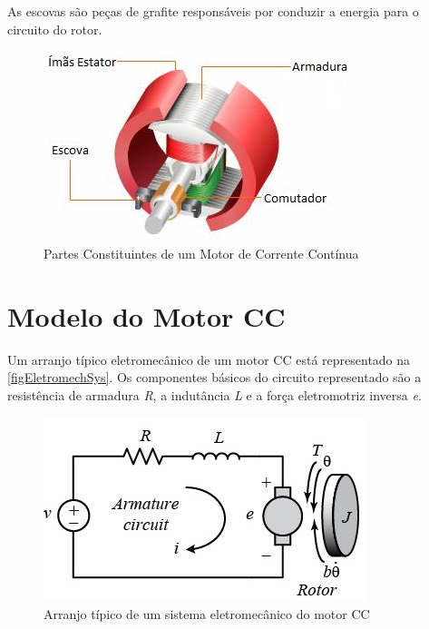 \documentclass[
	12pt,				%
	openright,			%
	oneside,			%
	a4paper,			%
	english,			%
	french,				%
	spanish,			%
	brazil,				%
	]{abntex2}
\begin{document}
As escovas são peças de grafite responsáveis por conduzir a energia para o circuito do rotor.

\begin{figure}[htb]
	\caption{\label{figMotorDC}Partes Constituintes de um Motor de Corrente Contínua}
	\begin{center}
	  \includegraphics{figuras/dcMotorParts.jpeg}
	\end{center}
\end{figure}

\section{Modelo do Motor CC}

Um arranjo típico eletromecânico de um motor CC está representado na \autoref{figEletromechSys}. Os componentes básicos do circuito representado são a resistência de armadura \textit{R}, a indutância \textit{L} e a força eletromotriz inversa \textit{e}.

\begin{figure}[htb]
	\caption{\label{figEletromechSys}Arranjo típico de um sistema eletromecânico do motor CC}
	\begin{center}
	  \includegraphics{figuras/dcEletroMech.jpg}
	\end{center}
\end{figure}
\end{document}
